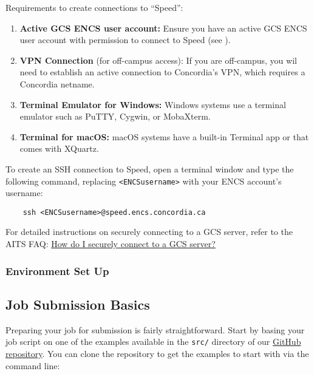 \documentclass{easychair}
\begin{document}
Requirements to create connections to ``Speed'':
\begin{enumerate}
	\item \textbf{Active GCS ENCS user account:} Ensure you have an active GCS ENCS user account with 
	permission to connect to Speed (see ).
	\item \textbf{VPN Connection} (for off-campus access): If you are off-campus, you wil need to establish an active connection to Concordia's VPN, 
	which requires a Concordia netname.
	\item \textbf{Terminal Emulator for Windows:} Windows systems use a terminal emulator such as PuTTY, Cygwin, or MobaXterm.
	\item \textbf{Terminal for macOS:} macOS systems have a built-in Terminal app or  that comes with XQuartz.
\end{enumerate}

\noindent To create an SSH connection to Speed, open a terminal window and type the following command, replacing \verb!<ENCSusername>! with your ENCS account's username:
\begin{verbatim}
    ssh <ENCSusername>@speed.encs.concordia.ca
\end{verbatim}

\noindent For detailed instructions on securely connecting to a GCS server, refer to the AITS FAQ: 
\href{https://www.concordia.ca/ginacody/aits/support/faq/ssh-to-gcs.html}{How do I securely connect to a GCS server?}

\subsubsection{Environment Set Up}
\label{sect:envsetup}


\subsection{Job Submission Basics}
\label{sect:job-submission-basics}

Preparing your job for submission is fairly straightforward.
Start by basing your job script on one of the examples available in the \texttt{src/}
directory of our \href{https://github.com/NAG-DevOps/speed-hpc}{GitHub repository}.
You can clone the repository to get the examples to start with via the command line:
\end{document}
